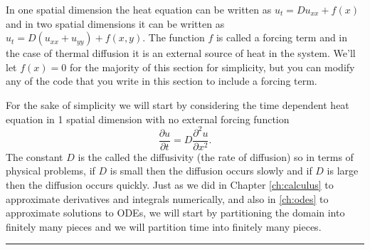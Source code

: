 \documentclass[
]{book}
\theoremstyle{definition}
\theoremstyle{definition}
\theoremstyle{definition}
\theoremstyle{remark}
\begin{document}
In one spatial dimension the heat equation can be written as \(u_t = Du_{xx} + f(x)\) and in two spatial dimensions it can be written as \(u_t = D \left( u_{xx} + u_{yy} \right) + f(x,y)\). The function \(f\) is called a forcing term and in the case of thermal diffusion it is an external source of heat in the system. We'll let \(f(x) = 0\) for the majority of this section for simplicity, but you can modify any of the code that you write in this section to include a forcing term.

For the sake of simplicity we will start by considering the time dependent heat equation in 1 spatial dimension with no external forcing function
\[ \frac{\partial u}{\partial t} = D \frac{\partial^2 u}{\partial x^2}. \]
The constant \(D\) is the called the diffusivity (the rate of diffusion) so in terms of physical problems, if \(D\) is small then the diffusion occurs slowly and if \(D\) is large then the diffusion occurs quickly. Just as we did in Chapter \ref{ch:calculus} to approximate derivatives and integrals numerically, and also in \ref{ch:odes} to approximate solutions to ODEs, we will start by partitioning the domain into finitely many pieces and we will partition time into finitely many pieces.

\begin{center}\rule{0.5\linewidth}{0.5pt}\end{center}
\end{document}
